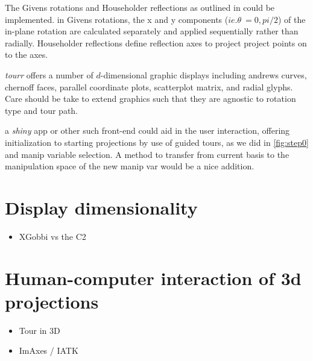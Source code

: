 \documentclass{monashthesis}
\begin{document}
The Givens rotations and Householder reflections as outlined in
\textcite{buja_computational_2005} could be implemented. in Givens
rotations, the x and y components (\(ie. \theta~= 0,pi/2\)) of the
in-plane rotation are calculated separately and applied sequentially
rather than radially. Householder reflections define reflection axes to
project project points on to the axes.

\emph{tourr} offers a number of \(d\)-dimensional graphic displays
including andrews curves, chernoff faces, parallel coordinate plots,
scatterplot matrix, and radial glyphs. Care should be take to extend
graphics such that they are agnostic to rotation type and tour path.

a \emph{shiny} app or other such front-end could aid in the user
interaction, offering initialization to starting projections by use of
guided tours, as we did in \ref{fig:step0} and manip variable selection.
A method to transfer from current basis to the manipulation space of the
new manip var would be a nice addition.

\chapter{Display dimensionality}\label{ch:disp_dim}

\begin{itemize}
\tightlist
\item
  XGobbi vs the C2
\end{itemize}

\chapter{Human-computer interaction of 3d
projections}\label{ch:hci_3dproj}

\begin{itemize}
\tightlist
\item
  Tour in 3D
\item
  ImAxes / IATK
\end{itemize}

\printbibliography[heading=bibintoc]
\end{document}
